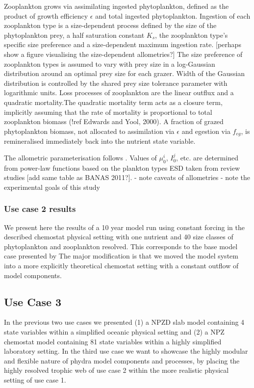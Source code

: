 \documentclass[template.tex]{subfiles}
\begin{document}
Zooplankton grows via assimilating ingested phytoplankton, defined as the product of growth efficiency $\epsilon$ and total ingested phytoplankton. Ingestion of each zooplankton type is a size-dependent process defined by the size of the phytoplankton prey, a half saturation constant $K_s$, the zooplankton type's specific size preference and a size-dependent maximum ingestion rate. [perhaps show a figure visualising the size-dependent allometries?]
The size preference of zooplankton types is assumed to vary with prey size in a log-Gaussian distribution around an optimal prey size for each grazer.
Width of the Gaussian distribution is controlled by the shared prey size tolerance parameter with logarithmic units.
Loss processes of zooplankton are the linear outflux and a quadratic mortality.The quadratic mortality term acts as a closure term, implicitly assuming that the rate of mortality is proportional to total zooplankton biomass (!ref Edwards and Yool, 2000). 
A fraction of grazed phytoplankton biomass, not allocated to assimilation via $\epsilon$ and egestion via $f_{eg}$, is remineralised immediately back into the nutrient state variable.

The allometric parameterisation follows \cite{Banas2011b}. Values of $\mu^i_0$, $I^j_0$, etc. are determined from power-law functions based on the plankton types ESD taken from review studies [add same table as BANAS 2011?].
- note caveats of allometries
- note the experimental goals of this study


\subsubsection{Use case 2 results}

We present here the results of a 10 year model run using constant forcing in the described chemostat physical setting with one nutrient and 40 size classes of phytoplankton and zooplankton resolved. This corresponds to the base model case presented by \cite{Banas2011b} The major modification is that we moved the model system into a more explicitly theoretical chemostat setting with a constant outflow of model components. 


\subsection{Use Case 3}
In the previous two use cases we presented (1) a NPZD slab model containing 4 state variables within a simplified oceanic physical setting and (2) a NPZ chemostat model containing 81 state variables within a highly simplified laboratory setting. 
In the third use case we want to showcase the highly modular and flexible nature of phydra model components and processes, by placing the highly resolved trophic web of use case 2 within the more realistic physical setting of use case 1.
\end{document}

